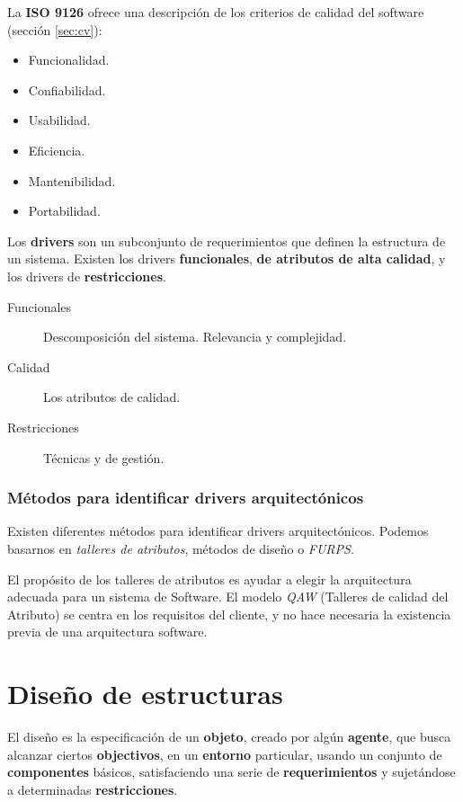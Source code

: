 La \textbf{ISO 9126} ofrece una descripción de los criterios de
calidad del software (sección \ref{sec:cv}):

\begin{itemize}[noitemsep]
\item Funcionalidad.
\item Confiabilidad.
\item Usabilidad.
\item Eficiencia.
\item Mantenibilidad.
\item Portabilidad.
\end{itemize}

Los \textbf{drivers} son un subconjunto de requerimientos que definen
la estructura de un sistema. Existen los drivers \textbf{funcionales},
\textbf{de atributos de alta calidad}, y los drivers de
\textbf{restricciones}.

\begin{description}
\item[Funcionales] Descomposición del sistema. Relevancia y
  complejidad.
\item[Calidad] Los atributos de calidad.
\item[Restricciones] Técnicas y de gestión.
\end{description}
\label{sec:drivers}

\subsubsection{Métodos para identificar drivers arquitectónicos}
\label{sec:drivers}

Existen diferentes métodos para identificar drivers
arquitectónicos. Podemos basarnos en \emph{talleres de atributos},
métodos de diseño o \emph{FURPS}.

El propósito de los talleres de atributos es ayudar a elegir la
arquitectura adecuada para un sistema de Software. El modelo
\emph{QAW} (Talleres de calidad del Atributo) se centra en los
requisitos del cliente, y no hace necesaria la existencia previa de
una arquitectura software.

\section{Diseño de estructuras}
\label{sec:arquitectura:diseñoestructura}

El diseño es la especificación de un \textbf{objeto}, creado por algún
\textbf{agente}, que busca alcanzar ciertos \textbf{objectivos}, en un
\textbf{entorno} particular, usando un conjunto de
\textbf{componentes} básicos, satisfaciendo una serie de
\textbf{requerimientos} y sujetándose a determinadas
\textbf{restricciones}.

